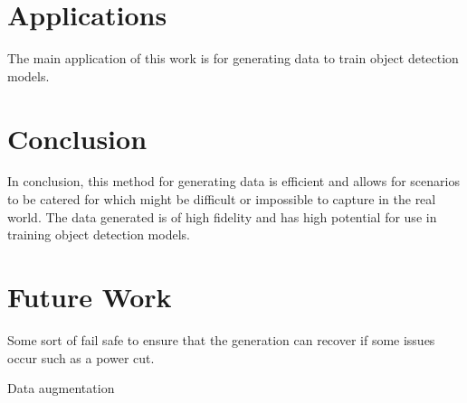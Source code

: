 \documentclass[10pt,twocolumn,letterpaper]{article}
\begin{document}
\section{Applications}

The main application of this work is for generating data to train object detection models. 

\section{Conclusion}

In conclusion, this method for generating data is efficient and allows for scenarios to be catered for which might be difficult or impossible to capture in the real world. The data generated is of high fidelity and has high potential for use in training object detection models.

\section{Future Work}

Some sort of fail safe to ensure that the generation can recover if some issues occur such as a power cut.

Data augmentation

{
    \small
    
    
}

% 
\end{document}
